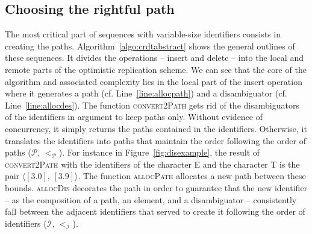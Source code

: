 

\subsection{Choosing the rightful path}
\label{subsec:choosing}

The most critical part of sequences with variable-size identifiers consists in
creating the paths. Algorithm~\ref{algo:crdtabstract} shows the general outlines
of these sequences. It divides the operations -- insert and delete -- into the
local and remote parts of the optimistic replication scheme. We can see that the
core of the algorithm and associated complexity lies in the local part of the
insert operation where it generates a path (cf. Line~\ref{line:allocpath}) and a
disambiguator (cf. Line~\ref{line:allocdes}). The function \textsc{convert2Path}
gets rid of the disambiguators of the identifiers in argument to keep paths
only. Without evidence of concurrency, it simply returns the paths contained in
the identifiers. Otherwise, it translates the identifiers into paths that
maintain the order following the order of paths
($\mathcal{P},\, <_{\mathcal{P}}$). For instance in Figure~\ref{fig:disexample},
the result of \textsc{convert2Path} with the identifiers of the character E and
the character T is the pair $\langle [3.0],\, [3.9]\rangle$. The function
\textsc{allocPath} allocates a new path between these bounds.  \textsc{allocDis}
decorates the path in order to guarantee that the new identifier -- as the
composition of a path, an element, and a disambiguator -- consistently fall
between the adjacent identifiers that served to create it following the order of
identifiers ($\mathcal{I}, \, <_\mathcal{I}$).

